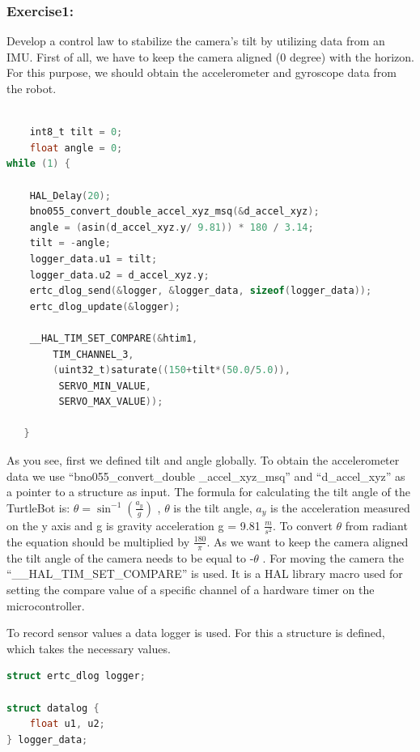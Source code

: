\documentclass[english]{article}
\begin{document}
\subsubsection{Exercise1:}
Develop a control law to stabilize the camera’s tilt by utilizing data from an IMU. \newline
First of all, we have to keep the camera aligned (0 degree) with the horizon. For
this purpose, we should obtain the accelerometer and gyroscope data from the robot.
\begin{lstlisting}[language=C, caption={C code using listings}, label={lst:cameraTilt} ]

    int8_t tilt = 0; 
    float angle = 0; 
while (1) { 

    HAL_Delay(20); 
    bno055_convert_double_accel_xyz_msq(&d_accel_xyz); 
    angle = (asin(d_accel_xyz.y/ 9.81)) * 180 / 3.14; 
    tilt = -angle; 
    logger_data.u1 = tilt; 
    logger_data.u2 = d_accel_xyz.y; 
    ertc_dlog_send(&logger, &logger_data, sizeof(logger_data)); 
    ertc_dlog_update(&logger); 

    __HAL_TIM_SET_COMPARE(&htim1,
        TIM_CHANNEL_3,
        (uint32_t)saturate((150+tilt*(50.0/5.0)),
         SERVO_MIN_VALUE, 
         SERVO_MAX_VALUE));  

   } 
\end{lstlisting}
As you see, first we defined tilt and angle globally. 
To obtain the accelerometer data we use “bno055\_convert\_double
\_accel\_xyz\_msq”
and “d\_accel\_xyz” as a pointer to a structure as input.
\newpage
The formula for calculating the tilt angle of the TurtleBot is: 
\textbf{$\theta = \sin^{-1}\left(\frac{a_y}{g}\right)$} , $\theta$ is the tilt angle,
${a_y}$ is the acceleration measured on the y axis and g is gravity acceleration g = 9.81 $\frac{m}{s^{2}}$.
To convert $\theta$ from radiant the equation should be multiplied by $\frac{180}{\pi}$.
As we want to keep the camera aligned the tilt angle of the camera needs to be equal to -$\theta$ .\newline
For moving the camera the “\_\_HAL\_TIM\_SET\_COMPARE” is used. It is a HAL library macro
 used for setting the compare value of a specific channel of a hardware timer on the microcontroller. \newline

  To record sensor values a data logger is used. For this a structure is defined, which takes the necessary values. 
\begin{lstlisting}[language=C, caption={}, label={lst:datalog} ]
struct ertc_dlog logger; 

struct datalog { 
    float u1, u2; 
} logger_data;  
\end{lstlisting} 
\end{document}
